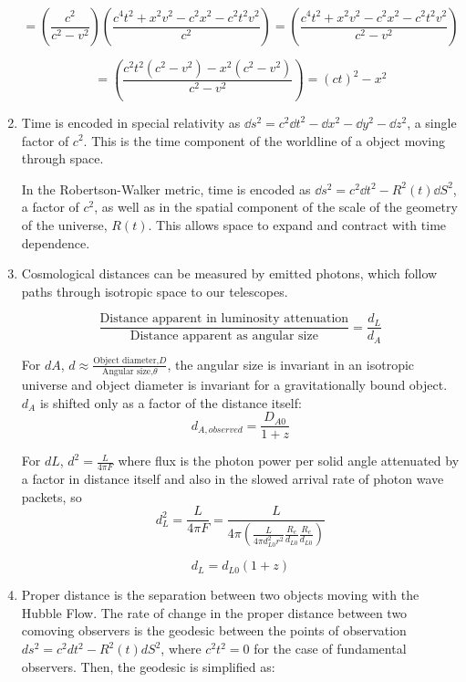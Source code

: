 \documentclass{paper}
\begin{document}
\begin{enumerate}
      \[ = \left(\frac{c^2}{c^2-v^2}\right)
      \left(\frac{c^4t^2 + x^2v^2 - c^2x^2 - c^2t^2v^2}{c^2}\right)
      = \left(\frac{c^4t^2 + x^2v^2 - c^2x^2 - c^2t^2v^2}{c^2 - v^2}\right)
      \]

      \[ = \left(\frac{c^2t^2(c^2 - v^2) - x^2(c^2 - v^2)}{c^2 - v^2}\right)
      = (ct)^2 - x^2 
      \]

    \item %
      Time is encoded in special relativity as
      \(\dd{s}^2 = c^2\dd{t}^2 - \dd{x}^2 - \dd{y}^2 - \dd{z}^2\), a single 
      factor of \(c^2\).  This is the time component of the worldline of a 
      object moving through space.

      In the Robertson-Walker metric, time is encoded as
      \(\dd{s}^2 = c^2\dd{t}^2 - R^2(t)\dd{S}^2\), a factor of \(c^2\), as 
      well as in the spatial component of the scale of the geometry of the 
      universe, \(R(t)\). This allows space to expand and contract with time
      dependence.

    \item %
      Cosmological distances can be measured by emitted photons, which follow 
      paths through isotropic space to our telescopes.

      \begin{equation}
        \frac{\textrm{Distance apparent in luminosity attenuation}}
        {\textrm{Distance apparent as angular size}}
        = \frac{d_L}{d_A}
      \end{equation}
      
      For \(dA\), \(d \approx \frac{\textrm{Object diameter,} D}
      {\textrm{Angular size,} \theta}\), the angular size is invariant in an 
      isotropic universe and object diameter is invariant for a 
      gravitationally bound object. \(d_A\) is shifted only as a factor of the 
      distance itself:
      \[ d_{A, observed} = \frac{D_{A0}}{1 + z} \]

      For \(dL\), \(d^2 = \frac{L}{4 \pi F}\) where flux is the photon power
      per solid angle attenuated by a factor in distance itself and also in 
      the slowed arrival rate of photon wave packets, so
      \[ d_L^2 = \frac{L}{4 \pi F} = 
      \frac{L}{4 \pi (\frac{L}{4 \pi d_{L0}^2 r^2} 
      \frac{R_e}{d_{L0}} \frac{R_e}{d_{L0}} ) } \]

      \[ d_L = d_{L0}(1 + z) \]

   \item %
      Proper distance is the separation between two objects moving with the
      Hubble Flow. The rate of change in the proper distance between two
      comoving observers is the geodesic between the points of observation
      \(ds^2 = c^2dt^2 - R^2(t)dS^2\), where \(c^2t^2 = 0 \) for the case of
      fundamental observers. Then, the geodesic is simplified as:


\end{enumerate}
\end{document}
